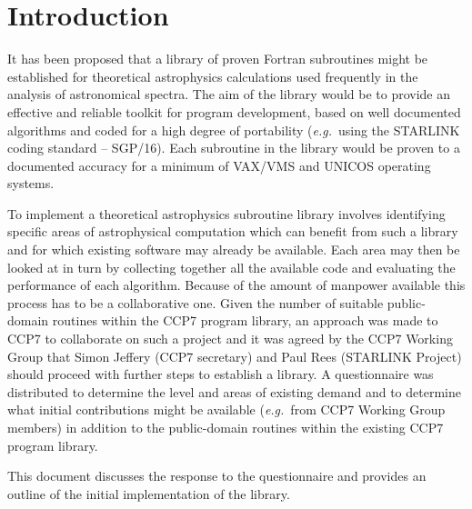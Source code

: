 \begin {abstract}
It is proposed that a well-documented subroutine library be written in the area
of theoretical astrophysics.
A questionnaire has been circulated to the UK astronomical community.
The response indicated interest in a library of subroutines mainly covering
the area of astronomical spectroscopy.
A preliminary discussion is presented of the intended contents of the
library, in terms of its functionality, design and documentation.
Targets for the development of the initial version of the library are given.
Comments are invited.
\end {abstract}

\section {Introduction}

It has been proposed that a library of proven Fortran subroutines might be
established for theoretical astrophysics calculations used frequently in the
analysis of astronomical spectra.
The aim of the library would be to provide an effective and reliable toolkit for
program development, based on well documented algorithms and coded for a
high degree of portability ({\em e.g.}\ using the STARLINK coding standard --
SGP/16).
Each subroutine in the library would be proven to a documented accuracy for
a minimum of VAX/VMS and UNICOS operating systems.

To implement a theoretical astrophysics subroutine library involves identifying
specific areas of astrophysical computation which can benefit from such a
library and for which existing software may already be available.
Each area may then be looked at in turn by collecting together all the available
code and evaluating the performance of each algorithm.
Because of the amount of manpower available this process has to be a
collaborative one.
Given the number of suitable public-domain routines within the CCP7
program library, an approach was made to CCP7 to collaborate on
such a project and it was agreed by the CCP7 Working Group that Simon
Jeffery (CCP7 secretary) and Paul Rees (STARLINK Project) should proceed
with further steps to establish a library.
A questionnaire was distributed to determine the level and areas of existing
demand and to determine what initial contributions might be available
({\em e.g.}\ from CCP7 Working Group members) in addition to the public-domain
routines within the existing CCP7 program library.

This document discusses the response to the questionnaire and provides an
outline of the initial implementation of the library.

